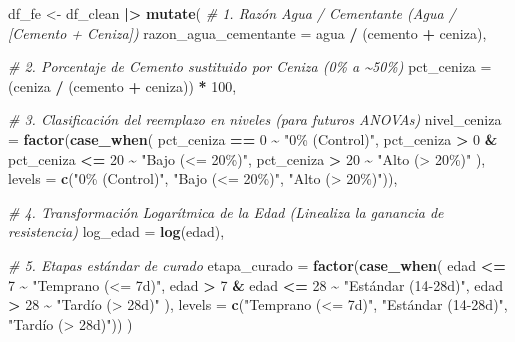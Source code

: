 \documentclass[
]{book}
\newenvironment{Shaded}{\begin{snugshade}}{\end{snugshade}}
\newcommand{\AttributeTok}[1]{\textcolor[rgb]{0.13,0.29,0.53}{#1}}
\newcommand{\CommentTok}[1]{\textcolor[rgb]{0.56,0.35,0.01}{\textit{#1}}}
\newcommand{\DecValTok}[1]{\textcolor[rgb]{0.00,0.00,0.81}{#1}}
\newcommand{\FunctionTok}[1]{\textcolor[rgb]{0.13,0.29,0.53}{\textbf{#1}}}
\newcommand{\NormalTok}[1]{#1}
\newcommand{\OtherTok}[1]{\textcolor[rgb]{0.56,0.35,0.01}{#1}}
\newcommand{\SpecialCharTok}[1]{\textcolor[rgb]{0.81,0.36,0.00}{\textbf{#1}}}
\newcommand{\StringTok}[1]{\textcolor[rgb]{0.31,0.60,0.02}{#1}}
\begin{document}
\begin{Shaded}
\begin{Highlighting}[]
\NormalTok{df\_fe }\OtherTok{\textless{}{-}}\NormalTok{ df\_clean }\SpecialCharTok{|\textgreater{}} 
  \FunctionTok{mutate}\NormalTok{(}
    \CommentTok{\# 1. Razón Agua / Cementante (Agua / [Cemento + Ceniza])}
    \AttributeTok{razon\_agua\_cementante =}\NormalTok{ agua }\SpecialCharTok{/}\NormalTok{ (cemento }\SpecialCharTok{+}\NormalTok{ ceniza),}
    
    \CommentTok{\# 2. Porcentaje de Cemento sustituido por Ceniza (0\% a \textasciitilde{}50\%)}
    \AttributeTok{pct\_ceniza =}\NormalTok{ (ceniza }\SpecialCharTok{/}\NormalTok{ (cemento }\SpecialCharTok{+}\NormalTok{ ceniza)) }\SpecialCharTok{*} \DecValTok{100}\NormalTok{,}
    
    \CommentTok{\# 3. Clasificación del reemplazo en niveles (para futuros ANOVAs)}
    \AttributeTok{nivel\_ceniza =} \FunctionTok{factor}\NormalTok{(}\FunctionTok{case\_when}\NormalTok{(}
\NormalTok{      pct\_ceniza }\SpecialCharTok{==} \DecValTok{0} \SpecialCharTok{\textasciitilde{}} \StringTok{"0\% (Control)"}\NormalTok{,}
\NormalTok{      pct\_ceniza }\SpecialCharTok{\textgreater{}} \DecValTok{0} \SpecialCharTok{\&}\NormalTok{ pct\_ceniza }\SpecialCharTok{\textless{}=} \DecValTok{20} \SpecialCharTok{\textasciitilde{}} \StringTok{"Bajo (\textless{}= 20\%)"}\NormalTok{,}
\NormalTok{      pct\_ceniza }\SpecialCharTok{\textgreater{}} \DecValTok{20} \SpecialCharTok{\textasciitilde{}} \StringTok{"Alto (\textgreater{} 20\%)"}
\NormalTok{    ), }\AttributeTok{levels =} \FunctionTok{c}\NormalTok{(}\StringTok{"0\% (Control)"}\NormalTok{, }\StringTok{"Bajo (\textless{}= 20\%)"}\NormalTok{, }\StringTok{"Alto (\textgreater{} 20\%)"}\NormalTok{)),}
    
    \CommentTok{\# 4. Transformación Logarítmica de la Edad (Linealiza la ganancia de resistencia)}
    \AttributeTok{log\_edad =} \FunctionTok{log}\NormalTok{(edad),}
    
    \CommentTok{\# 5. Etapas estándar de curado}
    \AttributeTok{etapa\_curado =} \FunctionTok{factor}\NormalTok{(}\FunctionTok{case\_when}\NormalTok{(}
\NormalTok{      edad }\SpecialCharTok{\textless{}=} \DecValTok{7} \SpecialCharTok{\textasciitilde{}} \StringTok{"Temprano (\textless{}= 7d)"}\NormalTok{,}
\NormalTok{      edad }\SpecialCharTok{\textgreater{}} \DecValTok{7} \SpecialCharTok{\&}\NormalTok{ edad }\SpecialCharTok{\textless{}=} \DecValTok{28} \SpecialCharTok{\textasciitilde{}} \StringTok{"Estándar (14{-}28d)"}\NormalTok{,}
\NormalTok{      edad }\SpecialCharTok{\textgreater{}} \DecValTok{28} \SpecialCharTok{\textasciitilde{}} \StringTok{"Tardío (\textgreater{} 28d)"}
\NormalTok{    ), }\AttributeTok{levels =} \FunctionTok{c}\NormalTok{(}\StringTok{"Temprano (\textless{}= 7d)"}\NormalTok{, }\StringTok{"Estándar (14{-}28d)"}\NormalTok{, }\StringTok{"Tardío (\textgreater{} 28d)"}\NormalTok{))}
\NormalTok{  )}
\end{Highlighting}
\end{Shaded}
\end{document}

